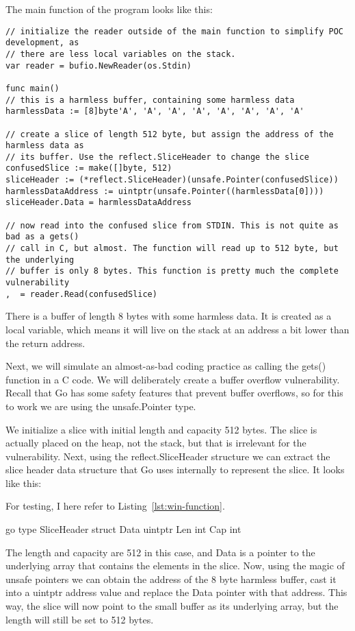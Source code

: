 The main function of the program looks like this:

\begin{lstlisting}[language=Golang, label=lst:redirection-poc-1, caption=Code flow redirection POC first part]
// initialize the reader outside of the main function to simplify POC development, as
// there are less local variables on the stack.
var reader = bufio.NewReader(os.Stdin)

func main()
// this is a harmless buffer, containing some harmless data
harmlessData := [8]byte'A', 'A', 'A', 'A', 'A', 'A', 'A', 'A'

// create a slice of length 512 byte, but assign the address of the harmless data as
// its buffer. Use the reflect.SliceHeader to change the slice
confusedSlice := make([]byte, 512)
sliceHeader := (*reflect.SliceHeader)(unsafe.Pointer(confusedSlice))
harmlessDataAddress := uintptr(unsafe.Pointer((harmlessData[0])))
sliceHeader.Data = harmlessDataAddress

// now read into the confused slice from STDIN. This is not quite as bad as a gets()
// call in C, but almost. The function will read up to 512 byte, but the underlying
// buffer is only 8 bytes. This function is pretty much the complete vulnerability
,  = reader.Read(confusedSlice)
\end{lstlisting}


There is a buffer of length 8 bytes with some harmless data. It is created as a local variable, which means it will live
on the stack at an address a bit lower than the return address.

Next, we will simulate an almost-as-bad coding practice as calling the gets() function in a C code. We will
deliberately create a buffer overflow vulnerability. Recall that Go has some safety features that prevent buffer
overflows, so for this to work we are using the unsafe.Pointer type.

We initialize a slice with initial length and capacity 512 bytes. The slice is actually placed on the heap, not the
stack, but that is irrelevant for the vulnerability. Next, using the reflect.SliceHeader structure we can extract
the slice header data structure that Go uses internally to represent the slice. It looks like this:

For testing, I here refer to Listing~\ref{lst:win-function}.

go
type SliceHeader struct
Data uintptr
Len  int
Cap  int



The length and capacity are 512 in this case, and Data is a pointer to the underlying array that contains the elements
in the slice. Now, using the magic of unsafe pointers we can obtain the address of the 8 byte harmless buffer, cast it
into a uintptr address value and replace the Data pointer with that address. This way, the slice will now point to the
small buffer as its underlying array, but the length will still be set to 512 bytes.

